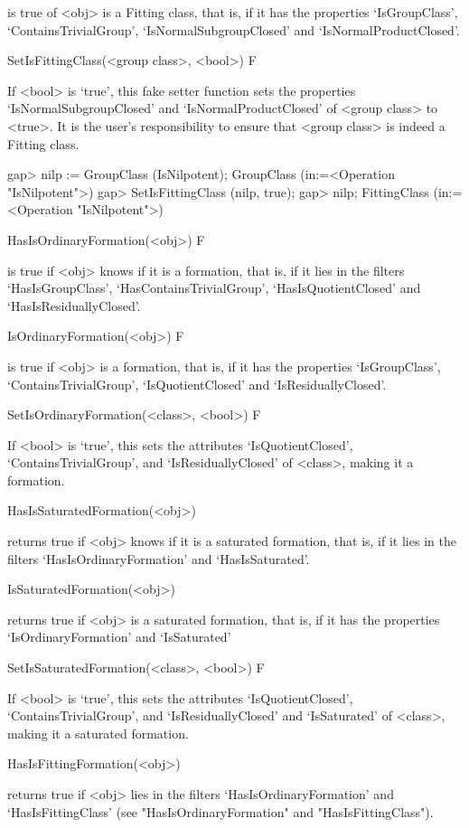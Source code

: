 is true of <obj> is a Fitting class, that is, if it has the properties
`IsGroupClass', `ContainsTrivialGroup', `IsNormalSubgroupClosed' and
`IsNormalProductClosed'.

\>SetIsFittingClass(<group class>, <bool>) F

If <bool> is `true', this fake setter function sets the properties
`IsNormalSubgroupClosed' and `IsNormalProductClosed' of <group class> to
<true>. It is the user's responsibility  to ensure that <group class> is
indeed a Fitting class.

\beginexample
gap> nilp := GroupClass (IsNilpotent);
GroupClass (in:=<Operation "IsNilpotent">)
gap> SetIsFittingClass (nilp, true);
gap> nilp;
FittingClass (in:=<Operation "IsNilpotent">)
\endexample

\>HasIsOrdinaryFormation(<obj>) F

%
is true if <obj> knows if it is a formation, that is, if it lies in the filters
`HasIsGroupClass', `HasContainsTrivialGroup', `HasIsQuotientClosed' and 
`HasIsResiduallyClosed'.

\>IsOrdinaryFormation(<obj>) F

%
is true if <obj> is a formation, that is, if it has the properties
`IsGroupClass', `ContainsTrivialGroup', `IsQuotientClosed' and `IsResiduallyClosed'.

\>SetIsOrdinaryFormation(<class>, <bool>) F

%
If <bool> is `true', this sets the attributes `IsQuotientClosed',
`ContainsTrivialGroup', and `IsResiduallyClosed' of <class>, making it a formation.

\>HasIsSaturatedFormation(<obj>) 

returns true if <obj> knows if it is a saturated formation, that is, if it
lies in the filters `HasIsOrdinaryFormation' and `HasIsSaturated'.

\>IsSaturatedFormation(<obj>) 

returns true if <obj> is a saturated formation, that is, if it has the
properties `IsOrdinaryFormation' and `IsSaturated'

\>SetIsSaturatedFormation(<class>, <bool>) F

If <bool> is `true', this sets the attributes `IsQuotientClosed',
`ContainsTrivialGroup', and `IsResiduallyClosed' and `IsSaturated'
of <class>, making it a saturated formation.

\>HasIsFittingFormation(<obj>) 

returns true if <obj> lies in the filters `HasIsOrdinaryFormation' and 
`HasIsFittingClass' (see "HasIsOrdinaryFormation" and "HasIsFittingClass").


